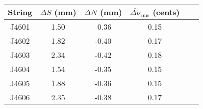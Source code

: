 \begin{tabular}{cccccc}
\toprule
String & $\Delta S$ (mm) & $\Delta N$ (mm) & $\overline{\Delta \nu}_\text{rms}$ (cents) \\
\midrule
J4601 & 1.50 & -0.36 & 0.15 \\
J4602 & 1.82 & -0.40 & 0.17 \\
J4603 & 2.34 & -0.42 & 0.18 \\
J4604 & 1.54 & -0.35 & 0.15 \\
J4605 & 1.88 & -0.36 & 0.15 \\
J4606 & 2.35 & -0.38 & 0.17 \\
\bottomrule
\end{tabular}

